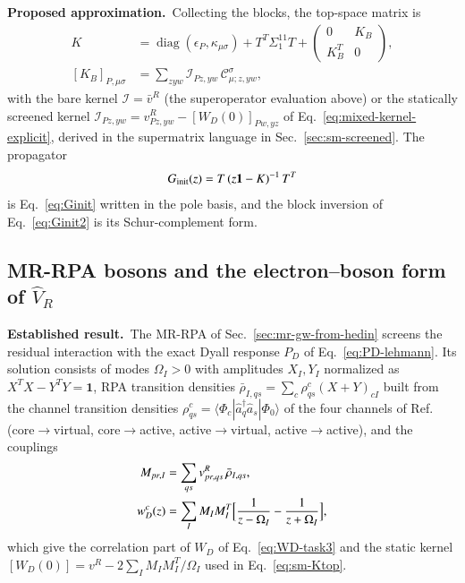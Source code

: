 \documentclass[aip,jcp,reprint,noshowkeys,superscriptaddress]{revtex4-1}
\newcommand{\Established}{\textbf{Established result.}\ }
\newcommand{\Proposed}{\textbf{Proposed approximation.}\ }
\begin{document}
\Proposed Collecting the blocks, the top-space matrix is
\begin{align}
  K&=\operatorname{diag}(\epsilon_P,\kappa_{\mu\sigma})
  +T^{T}\Sigma^{11}_1T
  +\begin{pmatrix}0&K_B\\K_B^{T}&0\end{pmatrix},
  \label{eq:sm-Ktop}\\
  [K_B]_{P,\mu\sigma}&=\sum_{zyw}\mathcal I_{Pz,yw}\,\mathcal C^{\sigma}_{\mu;z,yw},\nonumber
\end{align}
with the bare kernel $\mathcal I=\bar v^R$ (the superoperator evaluation
above) or the statically screened kernel
$\mathcal I_{Pz,yw}=v^R_{Pz,yw}-[W_D(0)]_{Pw,yz}$ of
Eq.~\eqref{eq:mixed-kernel-explicit}, derived in the supermatrix language in
Sec.~\ref{sec:sm-screened}.  The propagator
\begin{equation}
  G_{\rm init}(z)=T\,(z\mathbf 1-K)^{-1}\,T^{T}
  \label{eq:sm-Ginit}
\end{equation}
is Eq.~\eqref{eq:Ginit} written in the pole basis, and the block
inversion of Eq.~\eqref{eq:Ginit2} is its Schur-complement form.

\subsection{MR-RPA bosons and the electron--boson form of \texorpdfstring{$\hat V_R$}{VR}}

\Established The MR-RPA of Sec.~\ref{sec:mr-gw-from-hedin} screens the
residual interaction with the exact Dyall response $P_D$ of
Eq.~\eqref{eq:PD-lehmann}.  Its solution consists of modes $\Omega_I>0$
with amplitudes $X_I,Y_I$ normalized as $X^{T}X-Y^{T}Y=\mathbf 1$, RPA
transition densities $\bar\rho_{I,qs}=\sum_c\rho^{c}_{qs}(X+Y)_{cI}$ built
from the channel transition densities
$\rho^{c}_{qs}=\langle\Phi_c|\hat a_q^\dagger\hat a_s|\Phi_0\rangle$ of the
four channels of Ref.~\cite{WangFangLi2026} (core$\to$virtual,
core$\to$active, active$\to$virtual, active$\to$active), and the couplings
\begin{align}
  M_{pr,I}&=\sum_{qs}v^R_{pr,qs}\,\bar\rho_{I,qs},
  \label{eq:sm-M}\\
  w^{c}_D(z)&=\sum_IM_IM_I^{T}\Bigl[\frac{1}{z-\Omega_I}-\frac{1}{z+\Omega_I}\Bigr],\nonumber
\end{align}
which give the correlation part of $W_D$ of Eq.~\eqref{eq:WD-task3} and the
static kernel $[W_D(0)]=v^R-2\sum_IM_IM_I^{T}/\Omega_I$ used in
Eq.~\eqref{eq:sm-Ktop}.
\end{document}
